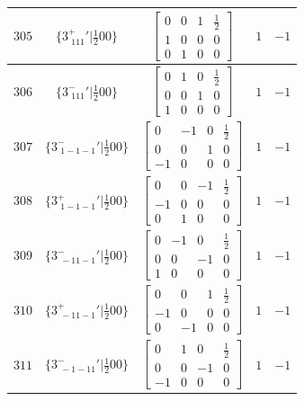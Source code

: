 \documentclass[fleqn,8pt]{jsarticle}
\begin{document}
\begin{longtable}{ccccc}
$ 305 $ & $ \{3^{+}_{\,\,111}{}'|\frac{1}{2} 0 0\} $ & $ \begin{bmatrix} 0 & 0 & 1 & \frac{1}{2} \\ 1 & 0 & 0 & 0 \\ 0 & 1 & 0 & 0 \end{bmatrix} $ & $ 1 $ & $ -1 $ \\ \hline
$ 306 $ & $ \{3^{-}_{\,\,111}{}'|\frac{1}{2} 0 0\} $ & $ \begin{bmatrix} 0 & 1 & 0 & \frac{1}{2} \\ 0 & 0 & 1 & 0 \\ 1 & 0 & 0 & 0 \end{bmatrix} $ & $ 1 $ & $ -1 $ \\ \hline
$ 307 $ & $ \{3^{-}_{\,\,1-1-1}{}'|\frac{1}{2} 0 0\} $ & $ \begin{bmatrix} 0 & -1 & 0 & \frac{1}{2} \\ 0 & 0 & 1 & 0 \\ -1 & 0 & 0 & 0 \end{bmatrix} $ & $ 1 $ & $ -1 $ \\ \hline
$ 308 $ & $ \{3^{+}_{\,\,1-1-1}{}'|\frac{1}{2} 0 0\} $ & $ \begin{bmatrix} 0 & 0 & -1 & \frac{1}{2} \\ -1 & 0 & 0 & 0 \\ 0 & 1 & 0 & 0 \end{bmatrix} $ & $ 1 $ & $ -1 $ \\ \hline
$ 309 $ & $ \{3^{-}_{\,\,-11-1}{}'|\frac{1}{2} 0 0\} $ & $ \begin{bmatrix} 0 & -1 & 0 & \frac{1}{2} \\ 0 & 0 & -1 & 0 \\ 1 & 0 & 0 & 0 \end{bmatrix} $ & $ 1 $ & $ -1 $ \\ \hline
$ 310 $ & $ \{3^{+}_{\,\,-11-1}{}'|\frac{1}{2} 0 0\} $ & $ \begin{bmatrix} 0 & 0 & 1 & \frac{1}{2} \\ -1 & 0 & 0 & 0 \\ 0 & -1 & 0 & 0 \end{bmatrix} $ & $ 1 $ & $ -1 $ \\ \hline
$ 311 $ & $ \{3^{-}_{\,\,-1-11}{}'|\frac{1}{2} 0 0\} $ & $ \begin{bmatrix} 0 & 1 & 0 & \frac{1}{2} \\ 0 & 0 & -1 & 0 \\ -1 & 0 & 0 & 0 \end{bmatrix} $ & $ 1 $ & $ -1 $ \\ \hline

\end{longtable}
\end{document}
